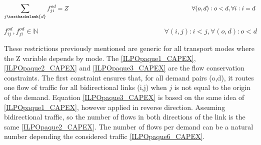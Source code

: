 \begin{equation}
\sum_{j\textbackslash \{d\}} f_{ji}^{od} = Z  \qquad \qquad \qquad \qquad \qquad \qquad \qquad \qquad \qquad \qquad
\forall(o,d) : o < d, \forall i: i = d
\label{ILPOpaque3_CAPEX}
\end{equation}

\begin{equation}
f_{ij}^{od} , f_{ji}^{od} \in \mathbb{N}   \qquad \qquad \qquad \qquad \qquad \qquad \qquad \qquad \qquad
\forall(i,j) : i < j, \forall(o,d) : o < d
\label{ILPOpaque6_CAPEX}
\end{equation}


These restrictions previously mentioned are generic for all transport modes where the Z variable depends by mode.
The \ref{ILPOpaque1_CAPEX}, \ref{ILPOpaque2_CAPEX} and \ref{ILPOpaque3_CAPEX} are the flow conservation constraints. The first constraint ensures that, for all demand pairs (o,d), it routes one flow of traffic for all bidirectional links (i,j) when $j$ is not equal to the origin of the demand. Equation \ref{ILPOpaque3_CAPEX} is based on the same idea of \ref{ILPOpaque1_CAPEX}, however applied in reverse direction. Assuming bidirectional traffic, so the number of flows in both directions of the link is the same \ref{ILPOpaque2_CAPEX}.
The number of flows per demand can be a natural number depending the considered traffic \ref{ILPOpaque6_CAPEX}.


